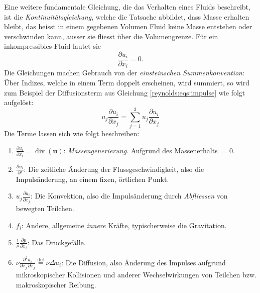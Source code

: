 Eine weitere fundamentale Gleichung, die das Verhalten eines Fluids beschreibt, ist die \emph{Kontinuitätsgleichung},
%
welche die Tatsache abbildet, dass Masse erhalten bleibt, das heisst in einem gegebenen Volumen Fluid keine Masse
entstehen oder verschwinden kann, ausser sie fliesst über die Volumengrenze. Für ein inkompressibles Fluid lautet sie
%
\begin{equation}
    \label{reynolds:eqs:mass}
    \frac{\partial u_i}{\partial x_i} = 0.
\end{equation}
%
Die Gleichungen machen Gebrauch von der \emph{einsteinschen Summenkonvention}: Über Indizes, welche in einem Term doppelt
%
erscheinen, wird summiert, so wird zum Beispiel der Diffusionsterm aus Gleichung \eqref{reynolds:eqs:impulse} wie folgt aufgelöst:
%
\begin{equation}
u_j \frac{\partial u_i}{\partial x_j} = \sum_{j=1}^{3} u_j \frac{\partial u_i}{\partial x_j}
\end{equation}
%
Die Terme lassen sich wie folgt beschreiben:
%
\begin{enumerate}
    \item $\frac{\partial u_i}{\partial x_i} = \operatorname{div}(\mathbf{u})$: \emph{Massengenerierung}.
%
    Aufgrund des Massenerhalts $ = 0$.
    \item $\frac{\partial u_i}{\partial t}$: Die zeitliche Änderung der Flussgeschwindigkeit, also die 
        Impulsänderung, an einem fixen, örtlichen Punkt.
%
    \item $u_j \frac{\partial u_i}{\partial x_j}$: Die Konvektion, also die Impulsänderung durch \emph{Abfliessen}
%
%
        von bewegten Teilchen.
    \item $f_i$: Andere, allgemeine \emph{innere} Kräfte, typischerweise die Gravitation.
%
%
    \item $\frac{1}{\rho} \frac{\partial p}{\partial x_i}$: Das Druckgefälle.
%
    \item $\nu \frac{\partial^2 u_i}{\partial x_j\, \partial x_j} \overset{\text{def}}{=} \nu \Delta u_i$: Die Diffusion, also Änderung des Impulses
%
        aufgrund mikroskopischer Kollisionen und anderer Wechselwirkungen von Teilchen bzw.
        makroskopischer Reibung.
\end{enumerate}
%
